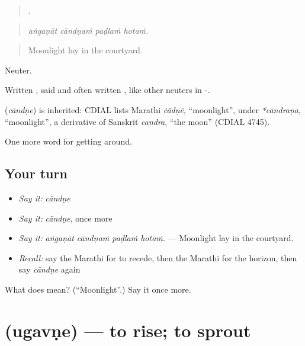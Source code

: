 \begin{quote}
   .
\end{quote}

\begin{quote}
\emph{aṅgaṇāt cāndṇaṁ paḍlaṁ hotaṁ.}
\end{quote}

\begin{quote}
Moonlight lay in the courtyard.
\end{quote}

Neuter.

Written , said and often written , like other neuters in -.

\begin{cousinweb}
\textbf{} (\emph{cāndṇe}) is inherited: CDIAL lists Marathi \emph{ċā̃dṇẽ}, \textquotedblleft{}moonlight\textquotedblright{}, under \emph{*cāndraṇa}, \textquotedblleft{}moonlight\textquotedblright{}, a derivative of Sanskrit \emph{candra}, \textquotedblleft{}the moon\textquotedblright{} (CDIAL 4745).
\end{cousinweb}

\begin{grammarlens}[title={What you've built}]
One more word for getting around.
\end{grammarlens}

\subsection*{Your turn}
\begin{itemize}
\raggedright
  \item \emph{Say it:} \emph{cāndṇe}
  \item \emph{Say it:} \emph{cāndṇe}, once more
  \item \emph{Say it:} \emph{aṅgaṇāt cāndṇaṁ paḍlaṁ hotaṁ.} — Moonlight lay in the courtyard.
  \item \emph{Recall:} say the Marathi for to recede, then the Marathi for the horizon, then say \emph{cāndṇe} again
\end{itemize}

\begin{tcolorbox}[breakable,colback=teal!4,colframe=teal!35!black,title={Before you move on}]
What does  mean? (\textquotedblleft{}Moonlight\textquotedblright{}.) Say it once more.
\end{tcolorbox}
\section[\texorpdfstring{\mr{उगवणे} (ugavṇe)}{उगवणे (ugavṇe)}]{ (ugavṇe) — to rise; to sprout}

